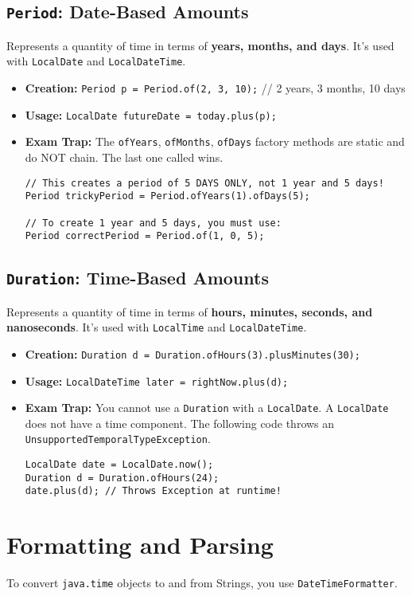 \documentclass[12pt]{article}
\begin{document}
\begin{enumerate}[label=(\arabic*)]
\subsection{\texttt{Period}: Date-Based Amounts}
Represents a quantity of time in terms of \textbf{years, months, and days}. It's used with \texttt{LocalDate} and \texttt{LocalDateTime}.
\begin{itemize}
    \item \textbf{Creation:} \texttt{Period p = Period.of(2, 3, 10);} // 2 years, 3 months, 10 days
    \item \textbf{Usage:} \texttt{LocalDate futureDate = today.plus(p);}
    \item \textbf{Exam Trap:} The \texttt{ofYears}, \texttt{ofMonths}, \texttt{ofDays} factory methods are static and do NOT chain. The last one called wins.
    \begin{verbatim}
// This creates a period of 5 DAYS ONLY, not 1 year and 5 days!
Period trickyPeriod = Period.ofYears(1).ofDays(5);

// To create 1 year and 5 days, you must use:
Period correctPeriod = Period.of(1, 0, 5);
    \end{verbatim}
\end{itemize}

\subsection{\texttt{Duration}: Time-Based Amounts}
Represents a quantity of time in terms of \textbf{hours, minutes, seconds, and nanoseconds}. It's used with \texttt{LocalTime} and \texttt{LocalDateTime}.
\begin{itemize}
    \item \textbf{Creation:} \texttt{Duration d = Duration.ofHours(3).plusMinutes(30);}
    \item \textbf{Usage:} \texttt{LocalDateTime later = rightNow.plus(d);}
    \item \textbf{Exam Trap:} You cannot use a \texttt{Duration} with a \texttt{LocalDate}. A \texttt{LocalDate} does not have a time component. The following code throws an \texttt{UnsupportedTemporalTypeException}.
    \begin{verbatim}
LocalDate date = LocalDate.now();
Duration d = Duration.ofHours(24);
date.plus(d); // Throws Exception at runtime!
    \end{verbatim}
\end{itemize}

\section{Formatting and Parsing}
To convert \texttt{java.time} objects to and from Strings, you use \texttt{DateTimeFormatter}.


\end{enumerate}
\end{document}
